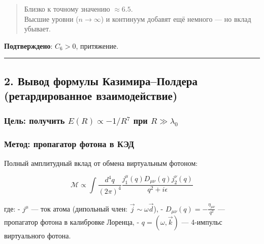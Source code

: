 \documentclass[11pt]{article}
\begin{document}
\begin{quote}
Близко к точному значению \(\approx 6.5\).\\
Высшие уровни (\(n \to \infty\)) и континуум добавят ещё немного --- но
вклад убывает.
\end{quote}

 \textbf{Подтверждено}: \(C_6 > 0\), притяжение.

\begin{center}\rule{0.5\linewidth}{\linethickness}\end{center}

\subsection{2. Вывод формулы Казимира--Полдера (ретардированное
взаимодействие)}\label{ux432ux44bux432ux43eux434-ux444ux43eux440ux43cux443ux43bux44b-ux43aux430ux437ux438ux43cux438ux440ux430ux43fux43eux43bux434ux435ux440ux430-ux440ux435ux442ux430ux440ux434ux438ux440ux43eux432ux430ux43dux43dux43eux435-ux432ux437ux430ux438ux43cux43eux434ux435ux439ux441ux442ux432ux438ux435}

\subsubsection{\texorpdfstring{Цель: получить \(E(R) \propto -1/R^7\)
при
\(R \gg \lambda_0\)}{Цель: получить E(R) \textbackslash{}propto -1/R\^{}7 при R \textbackslash{}gg \textbackslash{}lambda\_0}}\label{ux446ux435ux43bux44c-ux43fux43eux43bux443ux447ux438ux442ux44c-er-propto--1r7-ux43fux440ux438-r-gg-lambda_0}

\subsubsection{Метод: пропагатор фотона в
КЭД}\label{ux43cux435ux442ux43eux434-ux43fux440ux43eux43fux430ux433ux430ux442ux43eux440-ux444ux43eux442ux43eux43dux430-ux432-ux43aux44dux434}

Полный амплитудный вклад от обмена виртуальным фотоном:

\[
\mathcal{M} \propto \int \frac{d^4q}{(2\pi)^4} \frac{ j_1^\mu(q) D_{\mu\nu}(q) j_2^\nu(q) }{q^2 + i\epsilon}
\]

где: - \(j^\mu\) --- ток атома (дипольный член:
\(\vec{j} \sim \omega \vec{d}\)), -
\(D_{\mu\nu}(q) = -\frac{\eta_{\mu\nu}}{q^2}\) --- пропагатор фотона в
калибровке Лоренца, - \(q = (\omega, \vec{k})\) --- 4-импульс
виртуального фотона.
\end{document}
